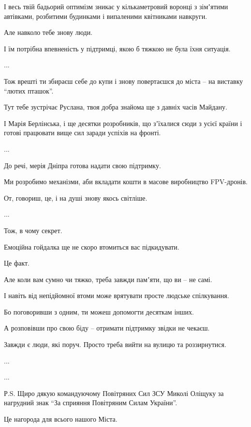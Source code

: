 І весь твій бадьорий оптимізм зникає у кількаметровий воронці з зімʼятими автівками, розбитими будинками і випаленими квітниками навкруги. \par
Але навколо тебе знову люди. \par
І їм потрібна впевненість у підтримці, якою б тяжкою не була їхня ситуація. \par
...\par
Тож врешті ти збираєш себе до купи і знову повертаєшся до міста – на виставку \enquote{лютих пташок}. \par
Тут тебе зустрічає Руслана, твоя добра знайома  ще з давніх часів Майдану. \par
І Марія Берлінська, і ще десятки розробників, що зʼїхалися сюди з усієї країни і готові працювати вище сил заради успіхів на фронті. \par
...\par
До речі, мерія Дніпра готова надати свою підтримку. \par
Ми розробимо механізми, аби вкладати кошти в масове виробництво FPV-дронів. \par
От, говориш, це, і на душі знову якось світліше.\par
...\par
Тож, в чому секрет. \par
Емоційна гойдалка ще не скоро втомиться вас підкидувати. \par
Це факт. \par
Але коли вам сумно чи тяжко, треба завжди памʼяти, що ви – не самі. \par
І навіть від непідйомної втоми може врятувати просте людське спілкування. \par
Бо поговоривши з одним, ти можеш допомогти десяткам інших. \par
А розповівши про свою біду – отримати підтримку звідки не чекаєш. \par
Завжди є люди, які поруч. Просто треба вийти на вулицю та роззирнутися. \par
...\par
...\par
Р.S. Щиро дякую командуючому Повітряних Сил ЗСУ Миколі Оліщуку за нагрудний знак \enquote{За сприяння Повітряним Силам України}.\par
Це нагорода для всього нашого Міста.\par


